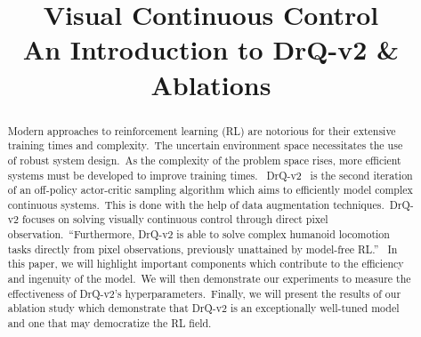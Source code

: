 \documentclass[conference]{./IEEEtran/IEEEtran} %
\begin{document}
    \title{Visual Continuous Control \\ {\large An Introduction to DrQ-v2 \& Ablations}}

    \author{
        \and
        \and
    }

    \maketitle

    \begin{abstract}
        
    Modern approaches to reinforcement learning (RL) are notorious for their extensive training times and complexity.\ The uncertain
    environment space necessitates the use of robust system design.\ As the complexity of the problem space rises, more efficient
    systems must be developed to improve training times. \ DrQ-v2~\cite{DrQv2} is the second iteration of an off-policy actor-critic
    sampling algorithm which aims to efficiently model complex continuous systems.\ This is done with the help of data augmentation
    techniques.\ DrQ-v2 focuses on solving visually continuous control through
    direct pixel observation.\ \enquote{Furthermore, DrQ-v2 is able to solve complex humanoid locomotion tasks directly from pixel
    observations, previously unattained by model-free RL.}~\cite{DrQv2} In this paper, we will highlight important components
    which contribute to the efficiency and ingenuity of the model.\ We will then demonstrate our experiments to measure the effectiveness of
    DrQ-v2's hyperparameters.\ Finally, we will present the results of our ablation study which demonstrate that DrQ-v2 is
    an exceptionally well-tuned model and one that may democratize the RL field.

    \end{abstract}
\end{document}
